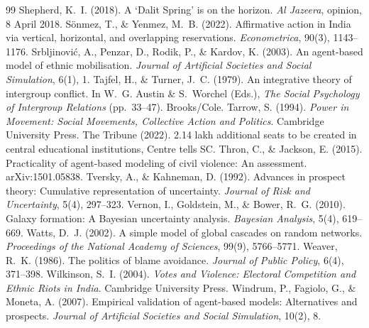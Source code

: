 \documentclass[11pt,a4paper]{article}
\begin{document}
\begin{thebibliography}{99}
 Shepherd, K.~I. (2018). A `Dalit Spring' is on the horizon. \emph{Al Jazeera}, opinion, 8 April 2018.
 S\"onmez, T., \& Yenmez, M.~B. (2022). Affirmative action in India via vertical, horizontal, and overlapping reservations. \emph{Econometrica}, 90(3), 1143--1176.
 Srbljinovi\'c, A., Penzar, D., Rodik, P., \& Kardov, K. (2003). An agent-based model of ethnic mobilisation. \emph{Journal of Artificial Societies and Social Simulation}, 6(1), 1.
 Tajfel, H., \& Turner, J.~C. (1979). An integrative theory of intergroup conflict. In W.~G. Austin \& S.~Worchel (Eds.), \emph{The Social Psychology of Intergroup Relations} (pp.~33--47). Brooks/Cole.
 Tarrow, S. (1994). \emph{Power in Movement: Social Movements, Collective Action and Politics}. Cambridge University Press.
 The Tribune (2022). 2.14 lakh additional seats to be created in central educational institutions, Centre tells SC.
 Thron, C., \& Jackson, E. (2015). Practicality of agent-based modeling of civil violence: An assessment. arXiv:1501.05838.
 Tversky, A., \& Kahneman, D. (1992). Advances in prospect theory: Cumulative representation of uncertainty. \emph{Journal of Risk and Uncertainty}, 5(4), 297--323.
 Vernon, I., Goldstein, M., \& Bower, R.~G. (2010). Galaxy formation: A Bayesian uncertainty analysis. \emph{Bayesian Analysis}, 5(4), 619--669.
 Watts, D.~J. (2002). A simple model of global cascades on random networks. \emph{Proceedings of the National Academy of Sciences}, 99(9), 5766--5771.
 Weaver, R.~K. (1986). The politics of blame avoidance. \emph{Journal of Public Policy}, 6(4), 371--398.
 Wilkinson, S.~I. (2004). \emph{Votes and Violence: Electoral Competition and Ethnic Riots in India}. Cambridge University Press.
 Windrum, P., Fagiolo, G., \& Moneta, A. (2007). Empirical validation of agent-based models: Alternatives and prospects. \emph{Journal of Artificial Societies and Social Simulation}, 10(2), 8.
\end{thebibliography}
\end{document}
